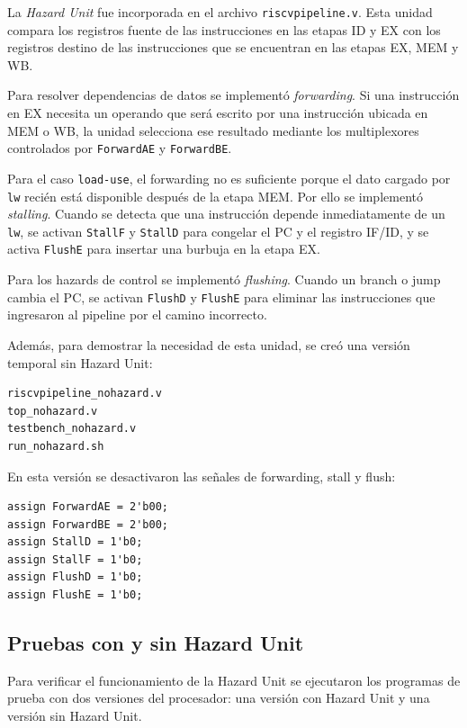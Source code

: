La \textit{Hazard Unit} fue incorporada en el archivo \texttt{riscvpipeline.v}. Esta unidad compara los registros fuente de las instrucciones en las etapas ID y EX con los registros destino de las instrucciones que se encuentran en las etapas EX, MEM y WB.

Para resolver dependencias de datos se implementó \textit{forwarding}. Si una instrucción en EX necesita un operando que será escrito por una instrucción ubicada en MEM o WB, la unidad selecciona ese resultado mediante los multiplexores controlados por \texttt{ForwardAE} y \texttt{ForwardBE}.

Para el caso \texttt{load-use}, el forwarding no es suficiente porque el dato cargado por \texttt{lw} recién está disponible después de la etapa MEM. Por ello se implementó \textit{stalling}. Cuando se detecta que una instrucción depende inmediatamente de un \texttt{lw}, se activan \texttt{StallF} y \texttt{StallD} para congelar el PC y el registro IF/ID, y se activa \texttt{FlushE} para insertar una burbuja en la etapa EX.

Para los hazards de control se implementó \textit{flushing}. Cuando un branch o jump cambia el PC, se activan \texttt{FlushD} y \texttt{FlushE} para eliminar las instrucciones que ingresaron al pipeline por el camino incorrecto.

Además, para demostrar la necesidad de esta unidad, se creó una versión temporal sin Hazard Unit:

\begin{verbatim}
riscvpipeline_nohazard.v
top_nohazard.v
testbench_nohazard.v
run_nohazard.sh
\end{verbatim}

En esta versión se desactivaron las señales de forwarding, stall y flush:

\begin{verbatim}
assign ForwardAE = 2'b00;
assign ForwardBE = 2'b00;
assign StallD = 1'b0;
assign StallF = 1'b0;
assign FlushD = 1'b0;
assign FlushE = 1'b0;
\end{verbatim}

\subsection{Pruebas con y sin Hazard Unit}

Para verificar el funcionamiento de la Hazard Unit se ejecutaron los programas de prueba con dos versiones del procesador: una versión con Hazard Unit y una versión sin Hazard Unit.

